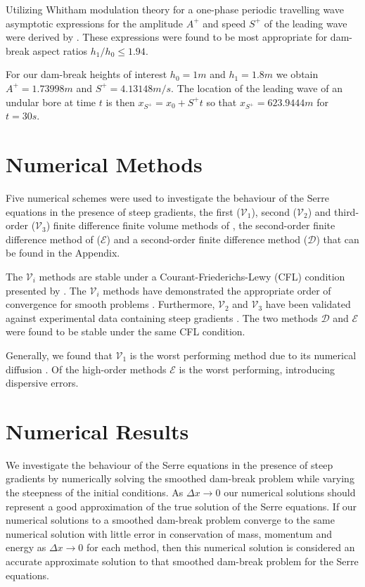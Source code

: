\documentclass[times]{elsarticle}
\begin{document}
Utilizing Whitham modulation theory for a one-phase periodic travelling wave asymptotic expressions for the amplitude $A^+$ and speed $S^+$ of the leading wave were derived by \citet{El-etal-2006}. These expressions were found to be most appropriate for dam-break aspect ratios $h_1/ h_0 \le 1.94$.

For our dam-break heights of interest $h_0 = 1m$ and $h_1 = 1.8m$ we obtain $A^+ = 1.73998m$ and $S^+ = 4.13148m/s$. The location of the leading wave of an undular bore at time $t$ is then $x_{S^+} = x_0 + S^+ t$ so that $x_{S^+} = 623.9444m$ for $t=30s$.

\section{Numerical Methods}
\label{sec:nummeth}
Five numerical schemes were used to investigate the behaviour of the Serre equations in the presence of steep gradients, the first ($\mathcal{V}_1$), second ($\mathcal{V}_2$) and third-order ($\mathcal{V}_3$) finite difference finite volume methods of \citet{Zoppou-etal-2017}, the second-order finite difference method of \citet{El-etal-2006} ($\mathcal{E}$) and a second-order finite difference method ($\mathcal{D}$) that can be found in the Appendix.

The $\mathcal{V}_i$ methods are stable under a Courant-Friederichs-Lewy (CFL) condition presented by \citet{Harten-etal-1983-357}. The $\mathcal{V}_i$ methods have demonstrated the appropriate order of convergence for smooth problems \cite{Zoppou-etal-2017}. Furthermore, $\mathcal{V}_2$ and $\mathcal{V}_3$ have been validated against experimental data containing steep gradients \cite{Zoppou-etal-2017}. The two methods $\mathcal{D}$ and $\mathcal{E}$ were found to be stable under the same CFL condition.

Generally, we found that $\mathcal{V}_1$ is the worst performing method due to its numerical diffusion \cite{Zoppou-etal-2017}. Of the high-order methods $\mathcal{E}$ is the worst performing, introducing dispersive errors.

\section{Numerical Results}
\label{section:NumRes}
We investigate the behaviour of the Serre equations in the presence of steep gradients by numerically solving the smoothed dam-break problem while varying the steepness of the initial conditions. As $\Delta x \rightarrow 0$ our numerical solutions should represent a good approximation of the true solution of the Serre equations. If our numerical solutions to a smoothed dam-break problem converge to the same numerical solution with little error in conservation of mass, momentum and energy as $\Delta x \rightarrow 0$ for each method, then this numerical solution is considered an accurate approximate solution to that smoothed dam-break problem for the Serre equations.
\end{document}
